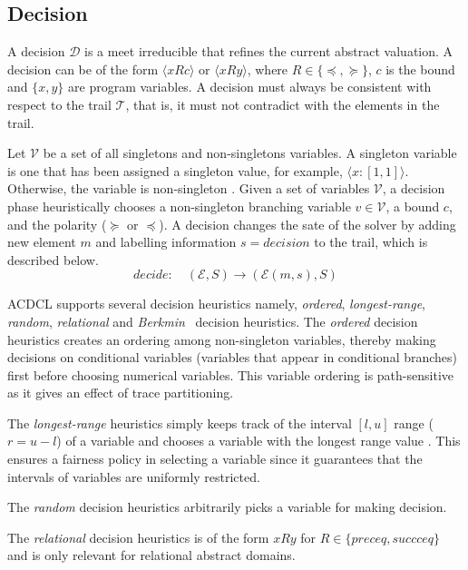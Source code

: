 \subsection{Decision}
A decision $\mathcal{D}$ is a meet irreducible that refines the 
current abstract valuation.  A decision can be of the form 
$\langle x R c \rangle$ or $\langle x R y \rangle$, where 
$R \in \{\preceq, \succeq\}$, $c$ is the bound and 
$\{x, y\}$ are program variables.  A decision must always 
be consistent with respect to the trail $\mathcal{T}$, that 
is, it must not contradict with the elements in the trail.  

Let $\mathcal{V}$ be a set of all singletons and non-singletons 
variables.  A singleton variable is one that has been assigned a 
singleton value, for example, $\langle x:[1,1] \rangle$.  Otherwise, 
the variable is non-singleton .  Given a set of variables $\mathcal{V}$, 
a decision phase heuristically chooses a non-singleton branching 
variable $v \in \mathcal{V}$, a bound $c$, and the polarity ($\succeq$ or 
$\preceq$).  A decision changes the sate of the solver by adding new element 
$m$ and labelling information $s=decision$ to the trail, which is described below. 
\[decide: \quad (\mathcal{E},S) \rightarrow (\mathcal{E}(m,s),S) \]

ACDCL supports several decision heuristics namely, {\em ordered}, 
{\em longest-range}, {\em random}, {\em relational} and 
{\em Berkmin}~\cite{eugoldberg07} decision heuristics.  
The {\em ordered} decision heuristics creates an ordering among non-singleton 
variables, thereby making decisions on conditional variables (variables that 
appear in conditional branches) first before choosing numerical variables.  
This variable ordering is path-sensitive as it gives an effect of trace
partitioning.  

The {\em longest-range} heuristics simply keeps track of the
interval $[l,u]$ range ($r=u-l$) of a variable and chooses a variable with 
the longest range value .  This ensures a fairness policy in selecting a 
variable since it guarantees that the intervals of variables are uniformly 
restricted.  

The {\em random} decision heuristics arbitrarily picks a variable 
for making decision. 

The {\em relational} decision heuristics is of the form 
$x R y$ for $R \in \{preceq, succceq\}$ and is only relevant for relational 
abstract domains.  

